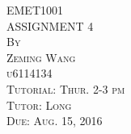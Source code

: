 \documentclass{article}
\begin{document}




\thispagestyle{empty}

\begin{center}
\huge
\vspace*{1.0in} EMET1001 
\\\vspace{0.5in} ASSIGNMENT 4
\normalsize
\\\vspace{0.5in} \textsc{By}
\\\vspace{0.1in} \textsc{Zeming Wang}
\\\vspace{0.1in} \textsc{u6114134}
\normalsize
\\\vspace{0.5in} \textsc{Tutorial: Thur. 2-3 pm}
\\\vspace{0.1in} \textsc{Tutor: Long}
\normalsize
\\\vspace{0.5in} \textsc{Due: Aug. 15, 2016}
\end{center}

\newpage
\setcounter{page}{1}
\end{document}

